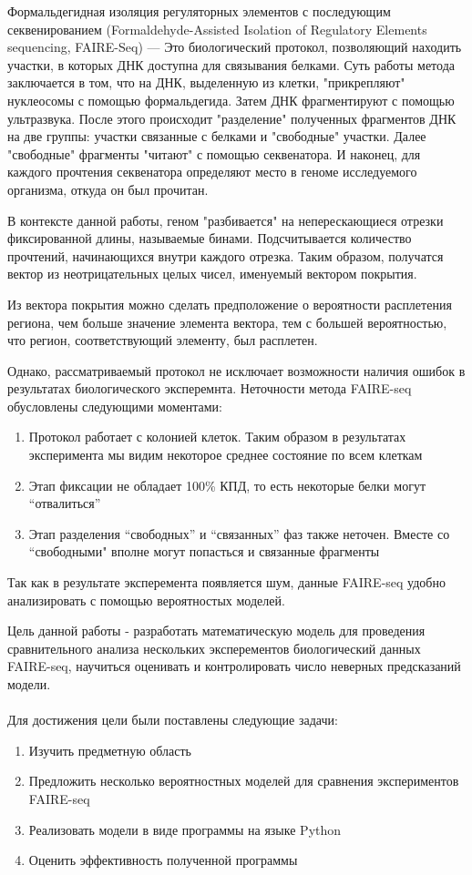 \documentclass{matmex-diploma}
\begin{document}
Формальдегидная изоляция регуляторных элементов с последующим секвенированием (Formaldehyde-Assisted Isolation of Regulatory Elements sequencing, FAIRE-Seq) --- Это биологический протокол, позволяющий находить участки, в которых ДНК доступна для связывания белками. Суть работы метода заключается в том, что на ДНК, выделенную из клетки, "прикрепляют" нуклеосомы с помощью формальдегида. Затем ДНК фрагментируют с помощью ультразвука. После этого происходит "разделение" полученных фрагментов ДНК на две группы: участки связанные с белками и "свободные" участки. Далее "свободные" фрагменты "читают" с помощью секвенатора. И наконец, для каждого прочтения секвенатора определяют место в геноме исследуемого организма, откуда он был прочитан.

В контексте данной работы, геном "разбивается" на неперескающиеся отрезки фиксированной длины, называемые бинами. Подсчитывается количество прочтений, начинающихся внутри каждого отрезка. Таким образом, получатся вектор из неотрицательных целых чисел, именуемый вектором покрытия.

Из вектора покрытия можно сделать предположение о вероятности расплетения региона, чем больше значение элемента вектора, тем с большей вероятностью, что регион, соответствующий элементу, был расплетен.

Однако, рассматриваемый протокол не исключает возможности наличия ошибок в результатах биологического эксперемнта. Неточности метода FAIRE-seq обусловлены следующими моментами:
\begin{enumerate}
\item
Протокол работает с колонией клеток. Таким образом в результатах эксперимента мы видим некоторое среднее состояние по всем клеткам
\item
Этап фиксации не обладает 100\% КПД, то есть некоторые белки могут “отвалиться” 
\item
Этап разделения “свободных” и “связанных” фаз также неточен. Вместе со “свободными" вполне могут попасться и связанные фрагменты
\end{enumerate}

Так как в результате эксперемента появляется шум, данные FAIRE-seq удобно анализировать с помощью вероятностых моделей.

Цель данной работы - разработать математическую модель для проведения сравнительного анализа нескольких эксперементов биологический данных FAIRE-seq, научиться оценивать и контролировать число неверных предсказаний модели. 
\\\\
Для достижения цели были поставлены следующие задачи:
\begin{enumerate}
\item
Изучить предметную область
\item
Предложить несколько вероятностных моделей для сравнения экспериментов FAIRE-seq
\item
Реализовать модели в виде программы на языке Python
\item
Оценить эффективность полученной программы
\end{enumerate}
\end{document}
